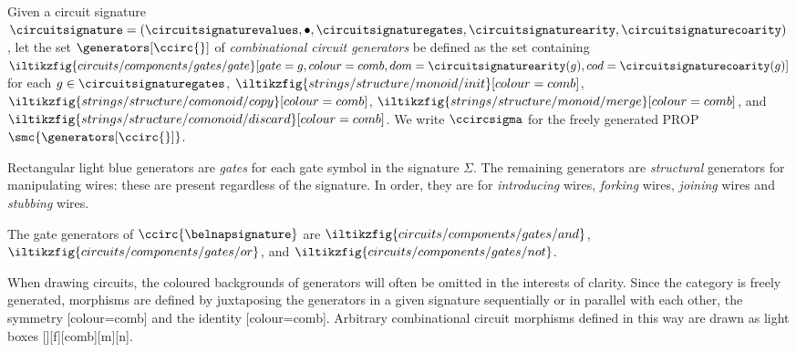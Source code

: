 \begin{definition}
    Given a circuit signature \(
        \circuitsignature = (
            \circuitsignaturevalues,
            \bullet,
            \circuitsignaturegates,
            \circuitsignaturearity,
            \circuitsignaturecoarity
        )
    \), let the set \(\generators[\ccirc{}]\) of
    \emph{combinational circuit generators} be defined as the set containing \(
        \iltikzfig{circuits/components/gates/gate}[gate=g,colour=comb,dom=\circuitsignaturearity(g),cod=\circuitsignaturecoarity(g)]
    \) for each \(g \in \circuitsignaturegates\),
    \(\iltikzfig{strings/structure/monoid/init}[colour=comb]\),
    \(\iltikzfig{strings/structure/comonoid/copy}[colour=comb]\),
    \(\iltikzfig{strings/structure/monoid/merge}[colour=comb]\), and
    \(\iltikzfig{strings/structure/comonoid/discard}[colour=comb]\).
    We write \(\ccircsigma\) for the freely generated PROP
    \(\smc{\generators[\ccirc{}]}\).
\end{definition}

Rectangular light blue generators are \emph{gates} for each gate symbol in the
signature \(\Sigma\).
The remaining generators are \emph{structural} generators for manipulating
wires: these are present regardless of the signature.
In order, they are for \emph{introducing} wires, \emph{forking}
wires, \emph{joining} wires and \emph{stubbing} wires.

\begin{example}
    The gate generators of \(\ccirc{\belnapsignature}\) are \(
        \iltikzfig{circuits/components/gates/and}
    \), \(
        \iltikzfig{circuits/components/gates/or}
    \), and \(
        \iltikzfig{circuits/components/gates/not}
    \).
\end{example}

When drawing circuits, the coloured backgrounds of generators will often be
omitted in the interests of clarity.
Since the category is freely generated, morphisms are defined by
juxtaposing the generators in a given signature sequentially or in parallel with
each other, the symmetry [colour=comb] and the
identity [colour=comb].
Arbitrary combinational circuit morphisms defined in this way are drawn as light
boxes [][f][comb][m][n].

